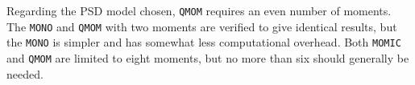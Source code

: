 \documentclass[preprint,letterpaper]{elsarticle}
\begin{document}
Regarding the PSD model chosen, \texttt{QMOM} requires an even number of moments. The \texttt{MONO} and \texttt{QMOM} with two moments are verified to give identical results, but the \texttt{MONO} is simpler and has somewhat less computational overhead. Both \texttt{MOMIC} and \texttt{QMOM} are limited to eight moments, but no more than six should generally be needed.



\end{document}
